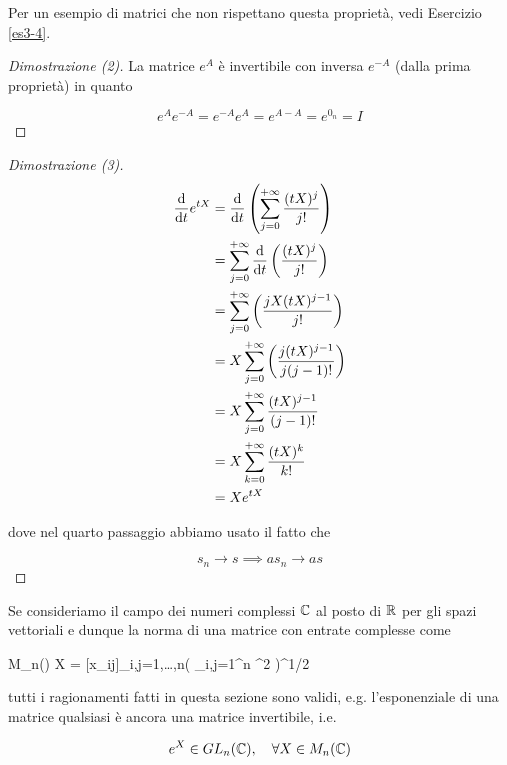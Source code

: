 Per un esempio di matrici che non rispettano questa proprietà, vedi Esercizio \ref{es3-4}.

\begin{proof}[Dimostrazione (2)]
	La matrice $ e^{A} $ è invertibile con inversa $ e^{-A} $ (dalla prima proprietà) in quanto
	
	\begin{equation}
		e^{A} e^{-A} = e^{-A} e^{A} = e^{A-A} = e^{0_{n}} = I
	\end{equation}
\end{proof}

\begin{proof}[Dimostrazione (3)]
	\begin{align}
		\begin{split}
			\dv{t} e^{t X} &= \dv{t} \left( \sum_{j=0}^{+\infty} \dfrac{(t X)^{j}}{j!} \right) \\
			&= \sum_{j=0}^{+\infty} \dv{t} \left( \dfrac{(t X)^{j}}{j!} \right) \\
			&= \sum_{j=0}^{+\infty} \left( \dfrac{j X (t X)^{j-1}}{j!} \right) \\
			&= X \sum_{j=0}^{+\infty} \left( \dfrac{j (t X)^{j-1}}{j (j-1)!} \right) \\
			&= X \sum_{j=0}^{+\infty} \dfrac{(t X)^{j-1}}{(j-1)!} \\
			&= X \sum_{k=0}^{+\infty} \dfrac{(t X)^{k}}{k!} \\
			&= X e^{t X}
		\end{split}
	\end{align}
	
	dove nel quarto passaggio abbiamo usato il fatto che
	
	\begin{equation}
		s_{n} \to s \implies a s_{n} \to a s
	\end{equation}
\end{proof}

\begin{remark}
	Se consideriamo il campo dei numeri complessi $ \mathbb{C} $ al posto di $ \mathbb{R} $ per gli spazi vettoriali e dunque la norma di una matrice con entrate complesse come
	
	\map{\norm{}}
		{M_{n}(\C)}{\R}
		{X = [x_{ij}]_{i,j=1,\dots,n}}{\left( \sum_{i,j=1}^{n} ^{2} \right)^{1/2}}
		
	tutti i ragionamenti fatti in questa sezione sono validi, e.g. l'esponenziale di una matrice qualsiasi è ancora una matrice invertibile, i.e.
	
	\begin{equation}
		e^{X} \in GL_{n}(\C) \qcomma \forall X \in M_{n}(\C)
	\end{equation}
\end{remark}

